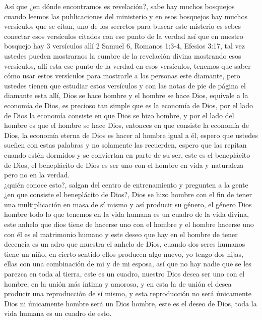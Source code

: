 \documentclass[12pt]{article}
\begin{document}
Así que ¿en dónde encontramos es revelación?, sabe hay muchos bosquejos cuando leemos las publicaciones del ministerio y en esos bosquejos hay muchos versículos que se citan, uno de los secretos para buscar este misterio es sebes conectar esos versículos citados con ese punto de la verdad así que en nuestro bosquejo hay 3 versículos allí 2 Samuel 6, Romanos 1:3-4, Efesios 3:17, tal vez ustedes pueden mostrarnos la cumbre de la revelación divina mostrando esos versículos, allí esta ese punto de la verdad en esos versículos, tenemos que saber cómo usar estos versículos para mostrarle a las personas este diamante, pero ustedes tienen que estudiar estos versículos y con las notas de pie de página el diamante esta allí, Dios se hace hombre y el hombre se hace Dios, equivale a la economía de Dios, es precioso tan simple que es la economía de Dios, por el lado de Dios la economía consiste en que Dios se hizo hombre, y por el lado del hombre es que el hombre se hace Dios, entonces en que consiste la economía de Dios, la economía eterna de Dios es hacer al hombre igual a él, espero que ustedes sueñen con estas palabras y no solamente las recuerden, espero que las repitan cuando estén dormidos y se conviertan en parte de su ser, este es el beneplácito de Dios, el beneplácito de Dios es ser uno con el hombre en vida y naturaleza pero no en la verdad.\\

¿quién conoce esto?, salgan del centro de entrenamiento y pregunten a la gente ¿en que consiste el beneplácito de Dios?, Dios se hizo hombre con el fin de tener una multiplicación en masa de sí mismo y así producir su género, el género Dios hombre todo lo que tenemos en la vida humana es un cuadro de la vida divina, este anhelo que dios tiene de hacerse uno con el hombre y el hombre hacerse uno con él es el matrimonio humano y este deseo que hay en el hombre de tener decencia es un adro que muestra el anhelo de Dios, cuando dos seres humanos tiene un niño, en cierto sentido ellos producen algo nuevo, yo tengo dos hijas, ellas con una combinación de mi y de mi esposa, así que no hay nadie que se les parezca en toda al tierra, este es un cuadro, nuestro Dios desea ser uno con el hombre, en la unión más íntima y amorosa, y en esta la de unión el desea producir una reproducción de sí mismo, y esta reproducción no será únicamente Dios ni únicamente hombre será un Dios hombre, este es el deseo de Dios, toda la vida humana es un cuadro de esto. \\
\end{document}
